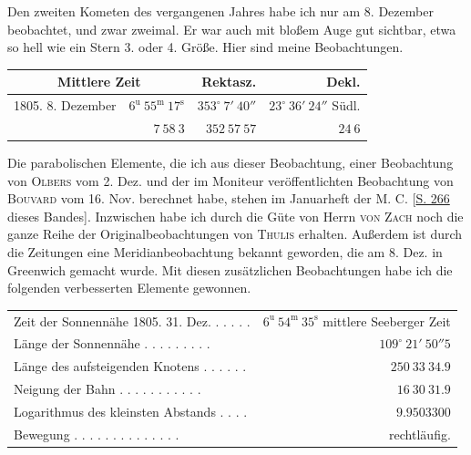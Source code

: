 
\par\indent Den zweiten Kometen des vergangenen Jahres habe ich nur am 8. Dezember beobachtet, und zwar zweimal. Er war auch mit bloßem Auge gut sichtbar, etwa so hell wie ein Stern 3. oder 4. Größe. Hier sind meine Beobachtungen.
\begin{center}
\begingroup\fontsize{9}{11}\selectfont\setlength{\tabcolsep}{2pt}\renewcommand{\arraystretch}{1.1}
\begin{tabular}{lr|r|r}
\multicolumn{2}{c|}{Mittlere Zeit} & Rektasz. & Dekl.\\ \hline
1805. 8. Dezember & $6^{\mathrm u}\ 55^{\mathrm m}\ 17^{\mathrm s}$ & $353^\circ\ 7'\ 40''$ & $23^\circ\ 36'\ 24''$ Südl.\\
& $7\ 58\ 3$ & $352\ 57\ 57$ & $24\ 6$\\
\end{tabular}\endgroup
\end{center}

\par\indent Die parabolischen Elemente, die ich aus dieser Beobachtung, einer Beobachtung von \textsc{Olbers} vom 2. Dez. und der im Moniteur veröffentlichten Beobachtung von \textsc{Bouvard} vom 16. Nov. berechnet habe, stehen im Januarheft der M. C. [\hyperlink{comet1805-2.1}{S. 266} dieses Bandes]. Inzwischen habe ich durch die Güte von Herrn \textsc{von Zach} noch die ganze Reihe der Originalbeobachtungen von \textsc{Thulis} erhalten. Außerdem ist durch die Zeitungen eine Meridianbeobachtung bekannt geworden, die am 8. Dez. in Greenwich gemacht wurde. Mit diesen zusätzlichen Beobachtungen habe ich die folgenden verbesserten Elemente gewonnen.

\begin{center}
\begingroup\fontsize{8}{10}\selectfont\setlength{\tabcolsep}{2pt}\renewcommand{\arraystretch}{1.1}
\begin{tabular}{lr}
Zeit der Sonnennähe 1805. 31. Dez. . . . . . & $6^{\mathrm u}\ 54^{\mathrm m}\ 35^{\mathrm s}$ mittlere Seeberger Zeit\\
Länge der Sonnennähe . . . . . . . . . & $109^\circ\ 21'\ 50''5$\\
Länge des aufsteigenden Knotens . . . . . . & $250\ 33\ 34.9$\\
Neigung der Bahn . . . . . . . . . . . & $16\ 30\ 31.9$\\
Logarithmus des kleinsten Abstands . . . . & $9.9503300$\\
Bewegung . . . . . . . . . . . . . . & rechtläufig.\\
\end{tabular}\endgroup
\end{center}

